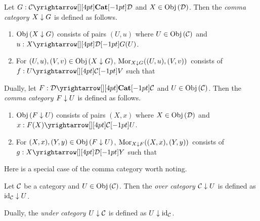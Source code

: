 \begin{dfn}\hypertarget{comma}{}
  
  Let $G : \map{\CC}{\DD}{\CAT}{}$ and $X \in \obj{\DD}$.
  Then the \emph{comma category $X\darrow G$} is defined as follows. 
  \begin{enumerate}
    \item $\obj{X\darrow G}$ consists of pairs $(U,u)$
    where $U \in \obj{\CC}$ and $u : \map{X}{G(U)}{\DD}{}$.
    \item For $(U,u), (V,v) \in \obj{X\darrow G}$, 
    $\mor{(U,u)}{(V,v)}{X\darrow G}$ consists of $f : \map{U}{V}{\CC}{}$
    such that \begin{figure}[H]
      \centering
    \end{figure}
  \end{enumerate}

  Dually, let $F : \map{\DD}{\CC}{\CAT}{}$ and $U \in \obj{\CC}$.
  Then the \emph{comma category $F\darrow U$} is defined as follows. 
  \begin{enumerate}
    \item $\obj{F\darrow U}$ consists of pairs $(X,x)$
    where $X \in \obj{\DD}$ and $x : \map{F(X)}{U}{\CC}{}$.
    \item For $(X,x), (Y,y) \in \obj{F\darrow U}$, 
    $\mor{(X,x)}{(Y,y)}{X\darrow F}$ consists of $g : \map{X}{Y}{\DD}{}$
    such that \begin{figure}[H]
      \centering
    \end{figure}
  \end{enumerate}
\end{dfn}

\begin{rmk}
  Here is a special case of the comma category worth noting. 
\end{rmk}

\begin{dfn}
  
  Let $\CC$ be a category and $U \in \obj{\CC}$.
  Then the \emph{over category $\CC\darrow U$} is defined as 
  $\id{\CC}\darrow U$. 

  Dually, the \emph{under category $U \darrow \CC$} is defined as 
  $U\darrow \id{\CC}$.
\end{dfn}

